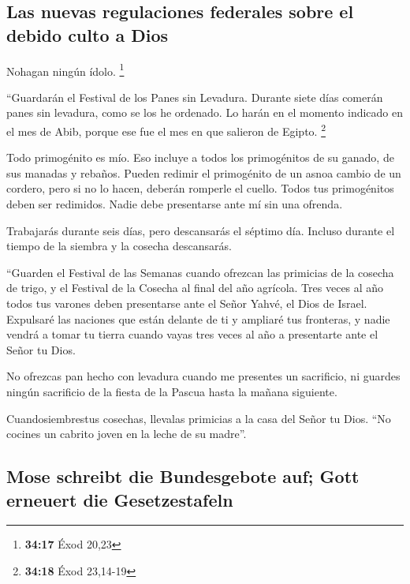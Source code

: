 \hypertarget{las-nuevas-regulaciones-federales-sobre-el-debido-culto-a-dios}{%
\subsection{Las nuevas regulaciones federales sobre el debido culto a
Dios}\label{las-nuevas-regulaciones-federales-sobre-el-debido-culto-a-dios}}

 Nohagan ningún ídolo. \footnote{\textbf{34:17} Éxod
  20,23}

 ``Guardarán el Festival de los Panes sin Levadura.
Durante siete días comerán panes sin levadura, como se los he ordenado.
Lo harán en el momento indicado en el mes de Abib, porque ese fue el mes
en que salieron de Egipto. \footnote{\textbf{34:18} Éxod 23,14-19}

 Todo primogénito es mío. Eso incluye a todos los
primogénitos de su ganado, de sus manadas y rebaños. 
Pueden redimir el primogénito de un asnoa cambio de un cordero, pero si
no lo hacen, deberán romperle el cuello. Todos tus primogénitos deben
ser redimidos. Nadie debe presentarse ante mí sin una ofrenda.

 Trabajarás durante seis días, pero descansarás el
séptimo día. Incluso durante el tiempo de la siembra y la cosecha
descansarás.

 ``Guarden el Festival de las Semanas cuando ofrezcan las
primicias de la cosecha de trigo, y el Festival de la Cosecha al final
del año agrícola.  Tres veces al año todos tus varones
deben presentarse ante el Señor Yahvé, el Dios de Israel.
 Expulsaré las naciones que están delante de ti y
ampliaré tus fronteras, y nadie vendrá a tomar tu tierra cuando vayas
tres veces al año a presentarte ante el Señor tu Dios.

 No ofrezcas pan hecho con levadura cuando me presentes
un sacrificio, ni guardes ningún sacrificio de la fiesta de la Pascua
hasta la mañana siguiente.

 Cuandosiembrestus cosechas, llevalas primicias a la casa
del Señor tu Dios. ``No cocines un cabrito joven en la leche de su
madre''.

\hypertarget{mose-schreibt-die-bundesgebote-auf-gott-erneuert-die-gesetzestafeln}{%
\subsection{Mose schreibt die Bundesgebote auf; Gott erneuert die
Gesetzestafeln}\label{mose-schreibt-die-bundesgebote-auf-gott-erneuert-die-gesetzestafeln}}

